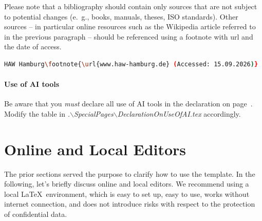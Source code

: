 Please note that a bibliography should contain only sources that are not subject to potential changes (e.~g., books, manuals, theses, ISO standards). Other sources -- in particular online resources such as the Wikipedia article referred to in the previous paragraph -- should be referenced using a footnote with url and the date of access.
%
\begin{lstlisting}[language=bash]
HAW Hamburg\footnote{\url{www.haw-hamburg.de} (Accessed: 15.09.2026)}
\end{lstlisting}


\paragraph{Use of AI tools} Be aware that you \emph{must} declare all use of AI tools in the declaration on page~\pageref{Declaration:AI}. Modify the table in \emph{.$\backslash$SpecialPages$\backslash$DeclarationOnUseOfAI.tex} accordingly.

\section{Online and Local Editors}

The prior sections served the purpose to clarify how to use the template. In the following, let's briefly discuss online and local editors. We recommend using a local \LaTeX\ environment, which is easy to set up, easy to use, works without internet connection, and does not introduce risks with respect to the protection of confidential data.


